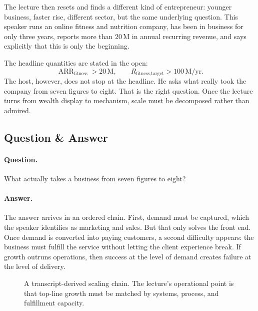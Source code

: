 The lecture then resets and finds a different kind of entrepreneur: younger business, faster rise, different sector, but the same underlying question. This speaker runs an online fitness and nutrition company, has been in business for only three years, reports more than $20\,\mathrm{M}$ in annual recurring revenue, and says explicitly that this is only the beginning.

The headline quantities are stated in the open:
\begin{equation}
\operatorname{ARR}_{\text{fitness}} > 20\,\mathrm{M}, \qquad
R_{\text{fitness,target}} > 100\,\mathrm{M}/\mathrm{yr}.
\end{equation}
The host, however, does not stop at the headline. He asks what really took the company from seven figures to eight. That is the right question. Once the lecture turns from wealth display to mechanism, scale must be decomposed rather than admired.

\subsection{Question \& Answer}

\paragraph{Question.} What actually takes a business from seven figures to eight?

\paragraph{Answer.} The answer arrives in an ordered chain. First, demand must be captured, which the speaker identifies as marketing and sales. But that only solves the front end. Once demand is converted into paying customers, a second difficulty appears: the business must fulfill the service without letting the client experience break. If growth outruns operations, then success at the level of demand creates failure at the level of delivery.

\begin{figure}[h]
\centering
{}
\caption{A transcript-derived scaling chain. The lecture's operational point is that top-line growth must be matched by systems, process, and fulfillment capacity.}
\end{figure}

